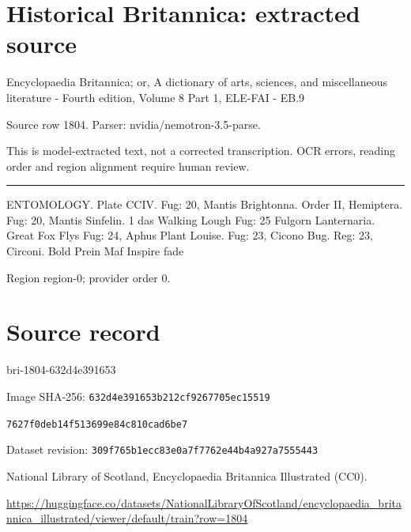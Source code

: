 \documentclass[11pt]{article}
\begin{document}
\section*{Historical Britannica: extracted source}
Encyclopaedia Britannica; or, A dictionary of arts, sciences, and miscellaneous literature - Fourth edition, Volume 8 Part 1, ELE-FAI - EB.9\par
{\small Source row 1804. Parser: nvidia/nemotron-3.5-parse.\par}
{\small This is model-extracted text, not a corrected transcription. OCR errors, reading order and region alignment require human review.\par}
\hrule\medskip
ENTOMOLOGY.
Plate CCIV.
Fug: 20, Mantis Brightonna. Order II, Hemiptera.
Fug: 20, Mantis Sinfelin.
1 das Walking Lough
Fug: 25 Fulgorn Lanternaria.
Great Fox Flys
Fug: 24, Aphus Plant Louise.
Fug: 23, Cicono Bug.
Reg: 23, Circoni.
Bold Prein Maf Inspire fade
\par

{\scriptsize\color{gray} Region region-0; provider order 0.\par}
\medskip
\newpage\section*{Source record}
bri-1804-632d4e391653\par
Image SHA-256: \texttt{632d4e391653b212cf9267705ec15519}\par\texttt{7627f0deb14f513699e84c810cad6be7}\par
Dataset revision: \texttt{309f765b1ecc83e0a7f7}\texttt{762e44b4a927a7555443}\par
National Library of Scotland, Encyclopaedia Britannica Illustrated (CC0).\par
\url{https://huggingface.co/datasets/NationalLibraryOfScotland/encyclopaedia_britannica_illustrated/viewer/default/train?row=1804}
\end{document}
